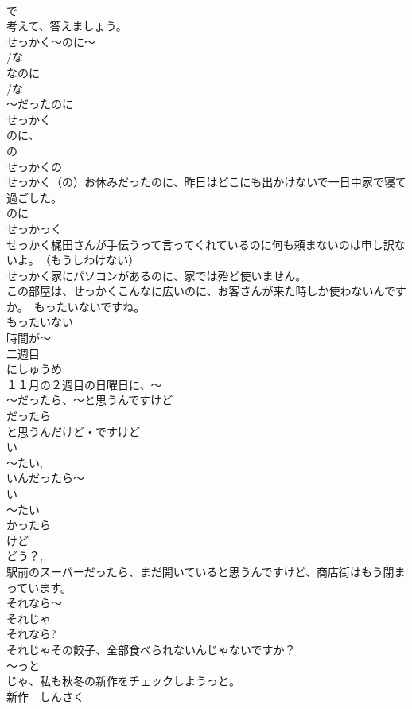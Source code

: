 \documentclass[8pt]{extreport}
\begin{document}
\begin{CJK}{UTF8}{min}
\\	で
\\	考えて、答えましょう。	
\\	せっかく～のに～
\\	/な
\\	なのに
\\	/な
\\	～だったのに
\\	せっかく
\\	のに、
\\	の 
\\	せっかくの
\\	せっかく（の）お休みだったのに、昨日はどこにも出かけないで一日中家で寝て過ごした。
\\	のに 
\\	せっかっく 
\\	せっかく梶田さんが手伝うって言ってくれているのに何も頼まないのは申し訳ないよ。　（もうしわけない）
\\	せっかく家にパソコンがあるのに、家では殆ど使いません。
\\	この部屋は、せっかくこんなに広いのに、お客さんが来た時しか使わないんですか。　もったいないですね。
\\	もったいない
\\	時間が～
\\	二週目
\\	にしゅうめ
\\	１１月の２週目の日曜日に、～	
\\	～だったら、～と思うんですけど
\\	だったら 
\\	と思うんだけど・ですけど 
\\	い
\\	～たい, 
\\	いんだったら～
\\	い
\\	～たい 
\\	かったら
\\	けど 
\\	どう？, 
\\	駅前のスーパーだったら、まだ開いていると思うんですけど、商店街はもう閉まっています。
\\	それなら～
\\	それじゃ
\\	それなら?
\\	それじゃその餃子、全部食べられないんじゃないですか？
\\	～っと 
\\	じゃ、私も秋冬の新作をチェックしようっと。
\\	新作　しんさく

\end{CJK}
\end{document}
